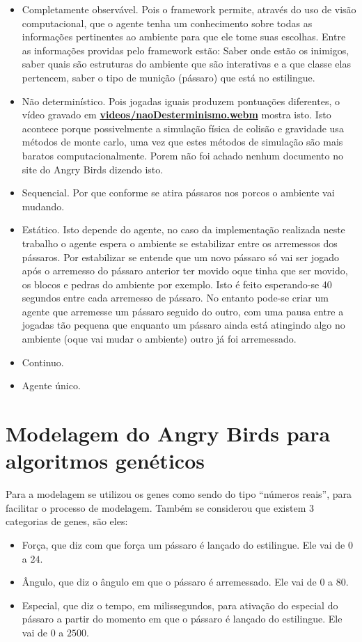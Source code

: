 \documentclass[10pt,a4paper]{article}
\begin{document}
\begin{itemize}
\item Completamente observável. Pois o framework permite, através do uso de visão computacional, que o agente tenha um conhecimento sobre todas as informações pertinentes ao ambiente para que ele tome suas escolhas. Entre as informações providas pelo framework estão: Saber onde estão os inimigos, saber quais são estruturas do ambiente que são interativas e a que classe elas pertencem, saber o tipo de munição (pássaro) que está no estilingue.
\item  Não determinístico. Pois jogadas iguais produzem pontuações diferentes, o vídeo gravado em \textbf{\url{videos/naoDesterminismo.webm}} mostra isto. Isto acontece porque possivelmente a simulação física de colisão e gravidade usa métodos de monte carlo, uma vez que estes métodos de simulação são mais baratos computacionalmente. Porem não foi achado nenhum documento no site do Angry Birds dizendo isto.
\item Sequencial. Por que conforme se atira pássaros nos porcos o ambiente vai mudando.
\item Estático. Isto depende do agente, no caso da implementação realizada neste trabalho o agente espera o ambiente se estabilizar entre os arremessos dos pássaros. Por estabilizar se entende  que um novo pássaro só vai ser jogado após  o arremesso do pássaro anterior ter movido oque tinha que ser movido, os blocos e pedras do ambiente por exemplo. Isto é feito esperando-se 40 segundos entre cada arremesso de pássaro.  No entanto pode-se criar um agente que arremesse um pássaro seguido do outro, com uma pausa entre a jogadas tão pequena que enquanto um pássaro ainda está atingindo algo no ambiente (oque vai mudar o ambiente) outro já foi arremessado. 
\item Continuo.
\item Agente único. 
\end{itemize}
\section{Modelagem do Angry Birds para algoritmos genéticos}
\label{sec:modelagem}
Para a modelagem se utilizou os genes como sendo do tipo ``números reais'', para facilitar o processo de modelagem. Também se considerou que existem 3 categorias de genes, são eles:
\begin{itemize}
  \item Força, que diz com que força um pássaro é lançado do estilingue. Ele vai de  $0$ a $24$.
  \item Ângulo, que diz o ângulo em que o pássaro é arremessado. Ele vai de  $0$ a $80$.
  \item Especial, que diz o tempo, em milissegundos, para ativação do especial do pássaro a partir do momento em que o pássaro é lançado do estilingue. Ele vai de  $0$ a $2500$.
\end{itemize}
\end{document}
